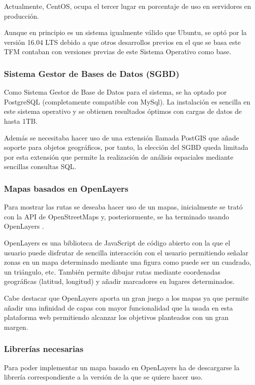 Actualmente, CentOS, ocupa el tercer lugar en porcentaje de uso en servidores en producción. \cite{uso:info}

Aunque en principio es un sistema igualmente válido que Ubuntu, se optó por la versión 16.04 LTS debido a que otros desarrollos previos en el que se basa este TFM contaban con versiones previas de este Sistema Operativo como base.

\subsubsection{Sistema Gestor de Bases de Datos (SGBD)}

Como Sistema Gestor de Base de Datos para el sistema, se ha optado por PostgreSQL (completamente compatible con MySql). La instalación es sencilla en este sistema operativo y se obtienen resultados óptimos con cargas de datos de hasta 1TB.

Además se necesitaba hacer uso de una extensión llamada PostGIS que añade soporte para objetos geográficos, por tanto, la elección del SGBD queda limitada por esta extensión que permite la realización de análisis espaciales mediante sencillas consultas SQL.

\subsubsection{Mapas basados en OpenLayers}

Para mostrar las rutas se deseaba hacer uso de un mapas, inicialmente se trató con la API de OpenStreetMaps y, posteriormente, se ha terminado usando OpenLayers \cite{openlayers:info}.

OpenLayers  es una biblioteca de JavaScript de código abierto con la que el usuario puede disfrutar de sencilla interacción con el usuario permitiendo señalar zonas en un mapa determinado mediante una figura como puede ser un cuadrado, un triángulo, etc. También permite dibujar rutas mediante coordenadas geográficas (latitud, longitud) y añadir marcadores en lugares determinados.

Cabe destacar que OpenLayers aporta un gran juego a los mapas ya que permite añadir una infinidad de capas con mayor funcionalidad que la usada en esta plataforma web permitiendo alcanzar los objetivos planteados con un gran margen.

\subsubsection{Librerías necesarias}
Para poder implementar un mapa basado en OpenLayers ha de descargarse la librería correspondiente a la versión de la que se quiere hacer uso.

